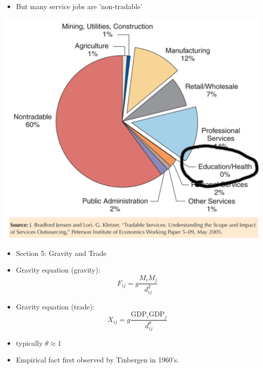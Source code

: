 \documentclass[ignorenonframetext,]{beamer}
\begin{document}
\begin{frame}

   \begin{itemize}
        \item But many service jobs are 'non-tradable'
    \end{itemize}

    \includegraphics[scale=0.20]{tradable_services_yikes.png}

\end{frame}

\begin{frame}

    \begin{itemize}
        \item Section 5: Gravity and Trade
    \end{itemize}

\end{frame}

\begin{frame}
    
    \begin{itemize}
        \item Gravity equation (gravity):
        \begin{equation*}
            F_{ij} = g \frac{M_i M_j}{d_{ij}^2}
        \end{equation*}
        \item Gravity equation (trade):
        \begin{equation*}
            X_{ij} = g \frac{\mbox{GDP}_i \mbox{GDP}_j}{d_{ij}^\theta}
        \end{equation*}
        \item typically $\theta \approx 1$
        \item Empirical fact first observed by Tinbergen in 1960's.
    \end{itemize}

\end{frame}
\end{document}

